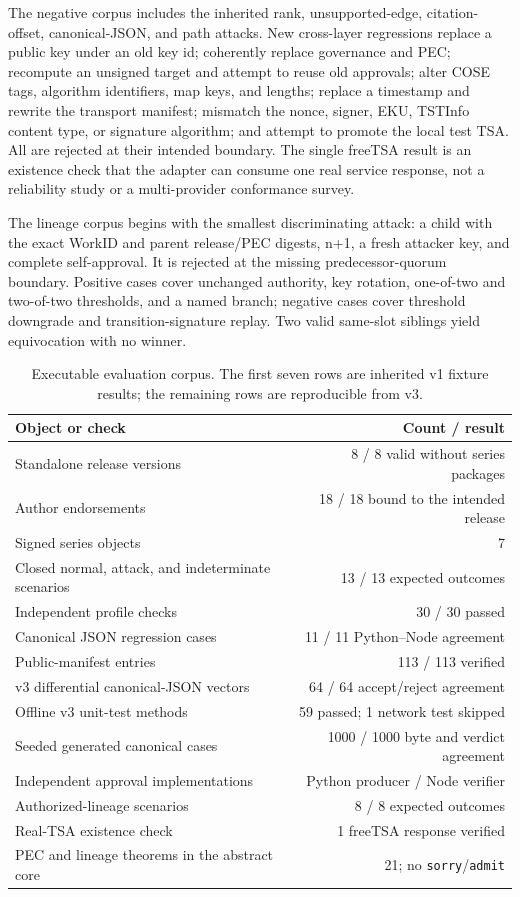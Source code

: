 \documentclass[11pt]{article}
\begin{document}
The negative corpus includes the inherited rank, unsupported-edge,
citation-offset, canonical-JSON, and path attacks. New cross-layer regressions
replace a public key under an old key id; coherently replace governance and PEC;
recompute an unsigned target and attempt to reuse old approvals; alter COSE tags,
algorithm identifiers, map keys, and lengths; replace a timestamp and rewrite
the transport manifest; mismatch the nonce, signer, EKU, TSTInfo content type,
or signature algorithm; and attempt to promote the local test TSA. All are
rejected at their intended boundary. The single freeTSA result is an existence
check that the adapter can consume one real service response, not a reliability
study or a multi-provider conformance survey.

The lineage corpus begins with the smallest discriminating attack: a child
with the exact WorkID and parent release/PEC digests, n+1, a fresh attacker
key, and complete self-approval. It is rejected at the missing
predecessor-quorum boundary. Positive cases cover unchanged authority, key
rotation, one-of-two and two-of-two thresholds, and a named branch; negative
cases cover threshold downgrade and transition-signature replay. Two valid
same-slot siblings yield equivocation with no winner.

\begin{table}[H]
\centering
\caption{Executable evaluation corpus. The first seven rows are inherited v1 fixture results; the remaining rows are reproducible from v3.}
\begin{tabular}{lr}
\toprule
Object or check & Count / result \\
\midrule
Standalone release versions & 8 / 8 valid without series packages \\
Author endorsements & 18 / 18 bound to the intended release \\
Signed series objects & 7 \\
Closed normal, attack, and indeterminate scenarios & 13 / 13 expected outcomes \\
Independent profile checks & 30 / 30 passed \\
Canonical JSON regression cases & 11 / 11 Python--Node agreement \\
Public-manifest entries & 113 / 113 verified \\
v3 differential canonical-JSON vectors & 64 / 64 accept/reject agreement \\
Offline v3 unit-test methods & 59 passed; 1 network test skipped \\
Seeded generated canonical cases & 1000 / 1000 byte and verdict agreement \\
Independent approval implementations & Python producer / Node verifier \\
Authorized-lineage scenarios & 8 / 8 expected outcomes \\
Real-TSA existence check & 1 freeTSA response verified \\
PEC and lineage theorems in the abstract core & 21; no \texttt{sorry}/\texttt{admit} \\
\bottomrule
\end{tabular}
\end{table}
\end{document}
